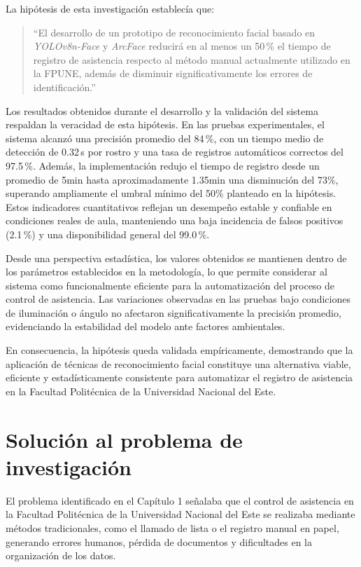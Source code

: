 La hipótesis de esta investigación establecía que:

\begin{quote}
“El desarrollo de un prototipo de reconocimiento facial basado en \textit{YOLOv8n-Face} y \textit{ArcFace} reducirá en al menos un 50\,\% el tiempo de registro de asistencia respecto al método manual actualmente utilizado en la FPUNE, además de disminuir significativamente los errores de identificación.”
\end{quote}

Los resultados obtenidos durante el desarrollo y la validación del sistema respaldan la veracidad de esta hipótesis. En las pruebas experimentales, el sistema alcanzó una precisión promedio del 84\,\%, con un tiempo medio de detección de 0.32\,s por rostro y una tasa de registros automáticos correctos del 97.5\,\%. Además, la implementación redujo el tiempo de registro desde un promedio de 5min hasta aproximadamente 1.35min una disminución del 73\%, superando ampliamente el umbral mínimo del 50\% planteado en la hipótesis. Estos indicadores cuantitativos reflejan un desempeño estable y confiable en condiciones reales de aula, manteniendo una baja incidencia de falsos positivos (2.1\,\%) y una disponibilidad general del 99.0\,\%.

Desde una perspectiva estadística, los valores obtenidos se mantienen dentro de los parámetros establecidos en la metodología, lo que permite considerar al sistema como funcionalmente eficiente para la automatización del proceso de control de asistencia. Las variaciones observadas en las pruebas bajo condiciones de iluminación o ángulo no afectaron significativamente la precisión promedio, evidenciando la estabilidad del modelo ante factores ambientales.

En consecuencia, la hipótesis queda validada empíricamente, demostrando que la aplicación de técnicas de reconocimiento facial constituye una alternativa viable, eficiente y estadísticamente consistente para automatizar el registro de asistencia en la Facultad Politécnica de la Universidad Nacional del Este.


\section{Solución al problema de investigación}

El problema identificado en el Capítulo 1 señalaba que el control de asistencia en la Facultad Politécnica de la Universidad Nacional del Este se realizaba mediante métodos tradicionales, como el llamado de lista o el registro manual en papel, generando errores humanos, pérdida de documentos y dificultades en la organización de los datos.

